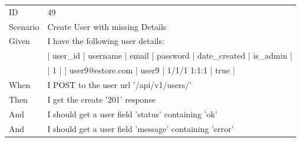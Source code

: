 \documentclass{report}
\begin{document}
\begin{tabular}{ l l }
ID 			& 49\\
Scenario		& Create User with missing Details\\
Given 		& I have the following user details: \\
      		& | user\_id | username | email            | password | date\_created | is\_admin | \\
      		& | 1       | | user9@estore.com | user9    | 1/1/1 1:1:1  | true     | \\
When 		& I POST to the user url '/api/v1/users/' \\
Then 		& I get the create '201' response \\
And 			& I should get a user field 'status' containing 'ok' \\
And 			& I should get a user field 'message' containing 'error' \\
\end{tabular}
\newpage
\end{document}
